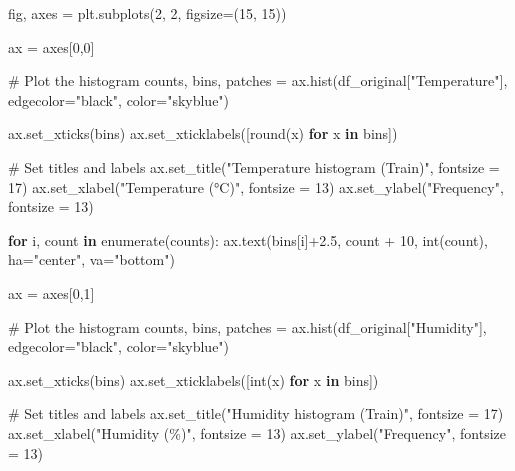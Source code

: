 \documentclass[
  letterpaper,
  DIV=11,
  numbers=noendperiod]{scrartcl}
\newenvironment{Shaded}{\begin{snugshade}}{\end{snugshade}}
\newcommand{\BuiltInTok}[1]{\textcolor[rgb]{0.00,0.23,0.31}{#1}}
\newcommand{\CommentTok}[1]{\textcolor[rgb]{0.37,0.37,0.37}{#1}}
\newcommand{\ControlFlowTok}[1]{\textcolor[rgb]{0.00,0.23,0.31}{\textbf{#1}}}
\newcommand{\DecValTok}[1]{\textcolor[rgb]{0.68,0.00,0.00}{#1}}
\newcommand{\FloatTok}[1]{\textcolor[rgb]{0.68,0.00,0.00}{#1}}
\newcommand{\KeywordTok}[1]{\textcolor[rgb]{0.00,0.23,0.31}{\textbf{#1}}}
\newcommand{\NormalTok}[1]{\textcolor[rgb]{0.00,0.23,0.31}{#1}}
\newcommand{\OperatorTok}[1]{\textcolor[rgb]{0.37,0.37,0.37}{#1}}
\newcommand{\StringTok}[1]{\textcolor[rgb]{0.13,0.47,0.30}{#1}}
\begin{document}
\begin{Shaded}
\begin{Highlighting}[]
\NormalTok{fig, axes }\OperatorTok{=}\NormalTok{ plt.subplots(}\DecValTok{2}\NormalTok{, }\DecValTok{2}\NormalTok{, figsize}\OperatorTok{=}\NormalTok{(}\DecValTok{15}\NormalTok{, }\DecValTok{15}\NormalTok{))}

\NormalTok{ax }\OperatorTok{=}\NormalTok{ axes[}\DecValTok{0}\NormalTok{,}\DecValTok{0}\NormalTok{]}

\CommentTok{\# Plot the histogram}
\NormalTok{counts, bins, patches }\OperatorTok{=}\NormalTok{ ax.hist(df\_original[}\StringTok{"Temperature"}\NormalTok{], edgecolor}\OperatorTok{=}\StringTok{"black"}\NormalTok{, color}\OperatorTok{=}\StringTok{"skyblue"}\NormalTok{)}

\NormalTok{ax.set\_xticks(bins) }
\NormalTok{ax.set\_xticklabels([}\BuiltInTok{round}\NormalTok{(x) }\ControlFlowTok{for}\NormalTok{ x }\KeywordTok{in}\NormalTok{ bins])}

\CommentTok{\# Set titles and labels}
\NormalTok{ax.set\_title(}\StringTok{"Temperature histogram (Train)"}\NormalTok{, fontsize }\OperatorTok{=} \DecValTok{17}\NormalTok{)}
\NormalTok{ax.set\_xlabel(}\StringTok{"Temperature (°C)"}\NormalTok{, fontsize }\OperatorTok{=} \DecValTok{13}\NormalTok{)}
\NormalTok{ax.set\_ylabel(}\StringTok{"Frequency"}\NormalTok{, fontsize }\OperatorTok{=} \DecValTok{13}\NormalTok{)}

\ControlFlowTok{for}\NormalTok{ i, count }\KeywordTok{in} \BuiltInTok{enumerate}\NormalTok{(counts):}
\NormalTok{    ax.text(bins[i]}\OperatorTok{+}\FloatTok{2.5}\NormalTok{, count }\OperatorTok{+} \DecValTok{10}\NormalTok{, }\BuiltInTok{int}\NormalTok{(count), ha}\OperatorTok{=}\StringTok{"center"}\NormalTok{, va}\OperatorTok{=}\StringTok{"bottom"}\NormalTok{)}

\NormalTok{ax }\OperatorTok{=}\NormalTok{ axes[}\DecValTok{0}\NormalTok{,}\DecValTok{1}\NormalTok{]}

\CommentTok{\# Plot the histogram}
\NormalTok{counts, bins, patches }\OperatorTok{=}\NormalTok{ ax.hist(df\_original[}\StringTok{"Humidity"}\NormalTok{], edgecolor}\OperatorTok{=}\StringTok{"black"}\NormalTok{, color}\OperatorTok{=}\StringTok{"skyblue"}\NormalTok{)}

\NormalTok{ax.set\_xticks(bins) }
\NormalTok{ax.set\_xticklabels([}\BuiltInTok{int}\NormalTok{(x) }\ControlFlowTok{for}\NormalTok{ x }\KeywordTok{in}\NormalTok{ bins])}

\CommentTok{\# Set titles and labels}
\NormalTok{ax.set\_title(}\StringTok{"Humidity histogram (Train)"}\NormalTok{, fontsize }\OperatorTok{=} \DecValTok{17}\NormalTok{)}
\NormalTok{ax.set\_xlabel(}\StringTok{"Humidity (\%)"}\NormalTok{, fontsize }\OperatorTok{=} \DecValTok{13}\NormalTok{)}
\NormalTok{ax.set\_ylabel(}\StringTok{"Frequency"}\NormalTok{, fontsize }\OperatorTok{=} \DecValTok{13}\NormalTok{)}


\end{Highlighting}
\end{Shaded}
\end{document}
